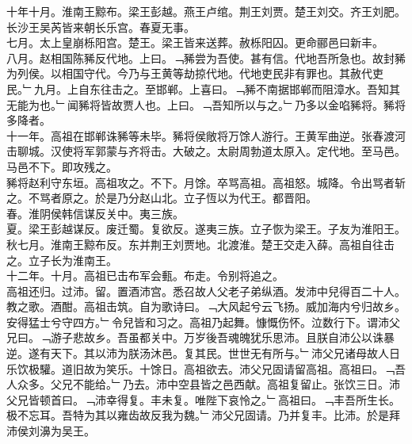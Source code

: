 \documentclass{zhvt-classic}
\begin{document}
\hspace*{2em}十年十月。淮南王黥布。梁王彭越。燕王卢绾。荆王刘贾。楚王刘交。齐王刘肥。长沙王吴芮皆来朝长乐宫。春夏无事。\\
\hspace*{2em}七月。太上皇崩栎阳宫。楚王。梁王皆来送葬。赦栎阳囚。更命郦邑曰新丰。\\
\hspace*{2em}八月。赵相国陈豨反代地。上曰。﹁豨尝为吾使。甚有信。代地吾所急也。故封豨为列侯。以相国守代。今乃与王黄等劫掠代地。代地吏民非有罪也。其赦代吏民。﹂九月。上自东往击之。至邯郸。上喜曰。﹁豨不南据邯郸而阻漳水。吾知其无能为也。﹂闻豨将皆故贾人也。上曰。﹁吾知所以与之。﹂乃多以金啗豨将。豨将多降者。\\
\hspace*{2em}十一年。高祖在邯郸诛豨等未毕。豨将侯敞将万馀人游行。王黄军曲逆。张春渡河击聊城。汉使将军郭蒙与齐将击。大破之。太尉周勃道太原入。定代地。至马邑。马邑不下。即攻残之。\\
\hspace*{2em}豨将赵利守东垣。高祖攻之。不下。月馀。卒骂高祖。高祖怒。城降。令出骂者斩之。不骂者原之。於是乃分赵山北。立子恆以为代王。都晋阳。\\
\hspace*{2em}春。淮阴侯韩信谋反关中。夷三族。\\
\hspace*{2em}夏。梁王彭越谋反。废迁蜀。复欲反。遂夷三族。立子恢为梁王。子友为淮阳王。\\
\hspace*{2em}秋七月。淮南王黥布反。东并荆王刘贾地。北渡淮。楚王交走入薛。高祖自往击之。立子长为淮南王。\\
\hspace*{2em}十二年。十月。高祖已击布军会甀。布走。令别将追之。\\
\hspace*{2em}高祖还归。过沛。留。置酒沛宫。悉召故人父老子弟纵酒。发沛中兒得百二十人。教之歌。酒酣。高祖击筑。自为歌诗曰。﹁大风起兮云飞扬。威加海内兮归故乡。安得猛士兮守四方。﹂令兒皆和习之。高祖乃起舞。慷慨伤怀。泣数行下。谓沛父兄曰。﹁游子悲故乡。吾虽都关中。万岁後吾魂魄犹乐思沛。且朕自沛公以诛暴逆。遂有天下。其以沛为朕汤沐邑。复其民。世世无有所与。﹂沛父兄诸母故人日乐饮极驩。道旧故为笑乐。十馀日。高祖欲去。沛父兄固请留高祖。高祖曰。﹁吾人众多。父兄不能给。﹂乃去。沛中空县皆之邑西献。高祖复留止。张饮三日。沛父兄皆顿首曰。﹁沛幸得复。丰未复。唯陛下哀怜之。﹂高祖曰。﹁丰吾所生长。极不忘耳。吾特为其以雍齿故反我为魏。﹂沛父兄固请。乃并复丰。比沛。於是拜沛侯刘濞为吴王。\\
\end{document}
